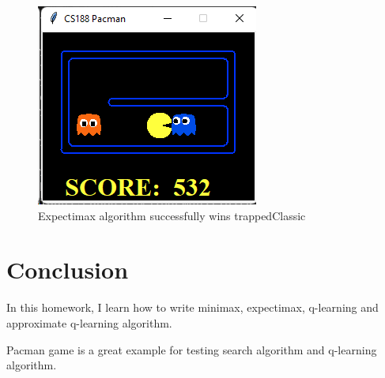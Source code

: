 \documentclass{article}[12pt]
\begin{document}
\begin{figure}[H]
\centering
\includegraphics[width=0.5\linewidth]{screenshot004}
\caption{Expectimax algorithm successfully wins trappedClassic}
\label{fig:screenshot004}
\end{figure}

\section{Conclusion}

In this homework, I learn how to write minimax, expectimax, q-learning and approximate q-learning algorithm.

Pacman game is a great example for testing search algorithm and q-learning algorithm.
\end{document}
